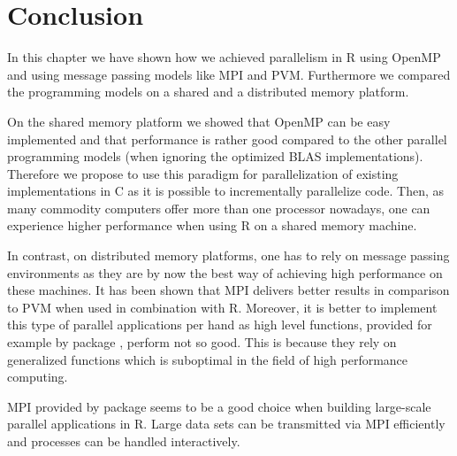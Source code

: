 

\section{Conclusion}

In this chapter we have shown how we achieved parallelism in R
using OpenMP and using message passing models like MPI and
PVM. Furthermore we compared the programming models on a shared and a
distributed memory platform.

On the shared memory platform we showed that OpenMP can be easy
implemented and that performance is rather good compared to the other
parallel programming models (when ignoring the optimized BLAS
implementations). Therefore we propose to use this paradigm for
parallelization of existing implementations in C as it is possible to
incrementally parallelize code. Then, as many commodity computers
offer more than one processor nowadays, one can experience higher
performance when using R on a shared memory machine.

In contrast, on distributed memory platforms, one has to rely on
message passing environments as they are by now the best way of
achieving high performance on these machines. It has been shown that
MPI delivers better results in comparison to PVM when used in
combination with R. Moreover, it is better to implement this type of
parallel applications per hand as high level functions, provided for
example by package , perform not so good. This is because
they rely on generalized functions which is suboptimal in the field of
high performance computing.

MPI provided by package  seems to be a good choice when
building large-scale parallel applications in R. Large data sets can
be transmitted via MPI efficiently and processes can be handled
interactively.


%
